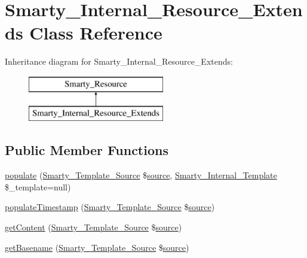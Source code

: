 \hypertarget{class_smarty___internal___resource___extends}{}\section{Smarty\+\_\+\+Internal\+\_\+\+Resource\+\_\+\+Extends Class Reference}
\label{class_smarty___internal___resource___extends}
Inheritance diagram for Smarty\+\_\+\+Internal\+\_\+\+Resource\+\_\+\+Extends\+:\begin{figure}[H]
\begin{center}
\leavevmode
\includegraphics[height=2.000000cm]{class_smarty___internal___resource___extends}
\end{center}
\end{figure}
\subsection*{Public Member Functions}
\begin{DoxyCompactItemize}
\item 
\hyperlink{class_smarty___internal___resource___extends_a07a771f460d625d63fcb72d0aeed0b01}{populate} (\hyperlink{class_smarty___template___source}{Smarty\+\_\+\+Template\+\_\+\+Source} \$\hyperlink{class_smarty___resource_ab6ac6b66dac2da6c41a178102f7d53e4}{source}, \hyperlink{class_smarty___internal___template}{Smarty\+\_\+\+Internal\+\_\+\+Template} \$\+\_\+template=null)
\item 
\hyperlink{class_smarty___internal___resource___extends_a0935298de0f84d80fdb2ec7c9c52a763}{populate\+Timestamp} (\hyperlink{class_smarty___template___source}{Smarty\+\_\+\+Template\+\_\+\+Source} \$\hyperlink{class_smarty___resource_ab6ac6b66dac2da6c41a178102f7d53e4}{source})
\item 
\hyperlink{class_smarty___internal___resource___extends_a0e40116a3d4f59cf7ea39f83441169b8}{get\+Content} (\hyperlink{class_smarty___template___source}{Smarty\+\_\+\+Template\+\_\+\+Source} \$\hyperlink{class_smarty___resource_ab6ac6b66dac2da6c41a178102f7d53e4}{source})
\item 
\hyperlink{class_smarty___internal___resource___extends_a91cdf7da12bdc51906539506dd26159b}{get\+Basename} (\hyperlink{class_smarty___template___source}{Smarty\+\_\+\+Template\+\_\+\+Source} \$\hyperlink{class_smarty___resource_ab6ac6b66dac2da6c41a178102f7d53e4}{source})
\end{DoxyCompactItemize}

